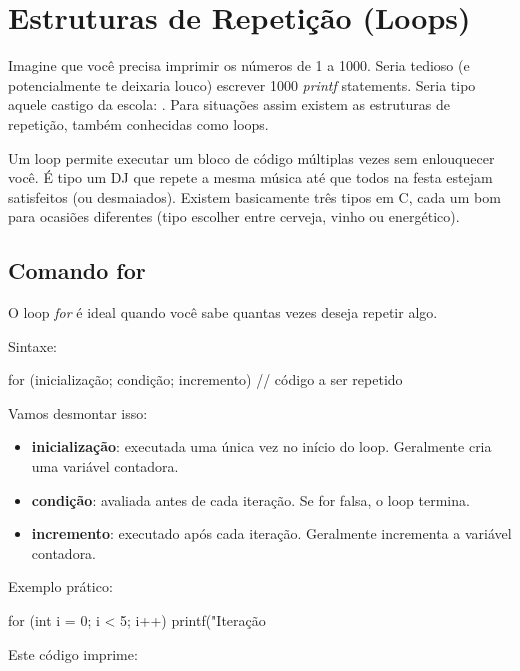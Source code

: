 
\chapter{Estruturas de Repetição (Loops)}

Imagine que você precisa imprimir os números de 1 a 1000. Seria tedioso (e potencialmente te deixaria louco) escrever 1000 \textit{printf} statements. Seria tipo aquele castigo da escola: . Para situações assim existem as estruturas de repetição, também conhecidas como loops.

Um loop permite executar um bloco de código múltiplas vezes sem enlouquecer você. É tipo um DJ que repete a mesma música até que todos na festa estejam satisfeitos (ou desmaiados). Existem basicamente três tipos em C, cada um bom para ocasiões diferentes (tipo escolher entre cerveja, vinho ou energético).

\section{Comando for}

O loop \textit{for} é ideal quando você sabe quantas vezes deseja repetir algo.

Sintaxe:

\begin{ccode}
  for (inicialização; condição; incremento) {
    // código a ser repetido
  }
\end{ccode}

Vamos desmontar isso:

\begin{itemize}
  \item \textbf{inicialização}: executada uma única vez no início do loop. Geralmente cria uma variável contadora.
  \item \textbf{condição}: avaliada antes de cada iteração. Se for falsa, o loop termina.
  \item \textbf{incremento}: executado após cada iteração. Geralmente incrementa a variável contadora.
\end{itemize}

Exemplo prático:

\begin{ccode}
  for (int i = 0; i < 5; i++) {
    printf("Iteração %
  }
\end{ccode}

Este código imprime:

